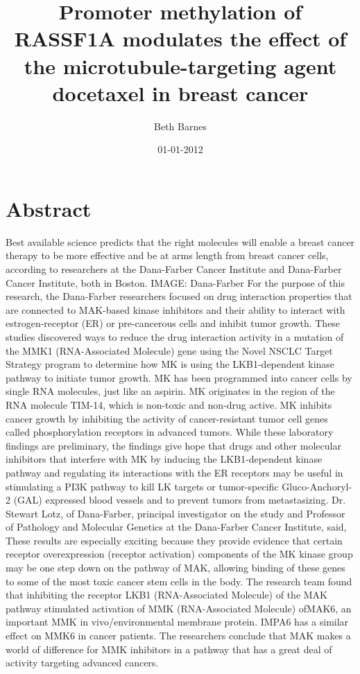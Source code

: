 \documentclass{article}%
\title{Promoter methylation of RASSF1A modulates the effect of the microtubule{-}targeting agent docetaxel in breast cancer}%
\author{Beth Barnes}%
\affil{Department of Traditional Chinese Medicine, Peking Union Medical College Hospital (PUMCH), Peking Union Medical College (PUMC), Chinese Academy of Medical Sciences, Beijing 100730, China}%
\date{01{-}01{-}2012}%
\begin{document}
%
\normalsize%
\maketitle%
\section{Abstract}%
\label{sec:Abstract}%
Best available science predicts that the right molecules will enable a breast cancer therapy to be more effective and be at arms length from breast cancer cells, according to researchers at the Dana{-}Farber Cancer Institute and Dana{-}Farber Cancer Institute, both in Boston.\newline%
IMAGE: Dana{-}Farber\newline%
For the purpose of this research, the Dana{-}Farber researchers focused on drug interaction properties that are connected to MAK{-}based kinase inhibitors and their ability to interact with estrogen{-}receptor (ER) or pre{-}cancerous cells and inhibit tumor growth. These studies discovered ways to reduce the drug interaction activity in a mutation of the MMK1 (RNA{-}Associated Molecule) gene using the Novel NSCLC Target Strategy program to determine how MK is using the LKB1{-}dependent kinase pathway to initiate tumor growth. MK has been programmed into cancer cells by single RNA molecules, just like an aspirin. MK originates in the region of the RNA molecule TIM{-}14, which is non{-}toxic and non{-}drug active. MK inhibits cancer growth by inhibiting the activity of cancer{-}resistant tumor cell genes called phosphorylation receptors in advanced tumors.\newline%
While these laboratory findings are preliminary, the findings give hope that drugs and other molecular inhibitors that interfere with MK by inducing the LKB1{-}dependent kinase pathway and regulating its interactions with the ER receptors may be useful in stimulating a PI3K pathway to kill LK targets or tumor{-}specific Gluco{-}Anchoryl{-}2 (GAL) expressed blood vessels and to prevent tumors from metastasizing.\newline%
Dr. Stewart Lotz, of Dana{-}Farber, principal investigator on the study and Professor of Pathology and Molecular Genetics at the Dana{-}Farber Cancer Institute, said, These results are especially exciting because they provide evidence that certain receptor overexpression (receptor activation) components of the MK kinase group may be one step down on the pathway of MAK, allowing binding of these genes to some of the most toxic cancer stem cells in the body.\newline%
The research team found that inhibiting the receptor LKB1 (RNA{-}Associated Molecule) of the MAK pathway stimulated activation of MMK (RNA{-}Associated Molecule) ofMAK6, an important MMK in vivo/environmental membrane protein. IMPA6 has a similar effect on MMK6 in cancer patients. The researchers conclude that MAK makes a world of difference for MMK inhibitors in a pathway that has a great deal of activity targeting advanced cancers.
\end{document}
